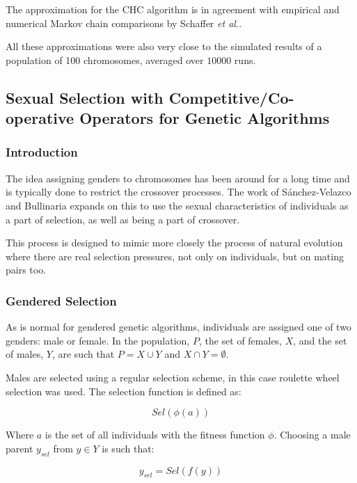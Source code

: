 \documentclass[10pt, a4paper]{article}
\begin{document}
The approximation for the CHC algorithm is in agreement with empirical and 
numerical Markov chain comparisons by Schaffer 
\textit{et al.}\cite{Schaffer1998Effect}.

All these approximations were also very close to the simulated results
of a population of 100 chromosomes, averaged over $10000$ runs.

\subsection{Sexual Selection with Competitive/Co-operative Operators for Genetic Algorithms}

\subsubsection{Introduction}
The idea assigning genders to chromosomes has been around for a long time
and is typically done to restrict the crossover processes. The work of
S\'anchez-Velazco and Bullinaria\cite{SanchezVelazco2003Sexual} expands on this
to use the sexual characteristics of individuals as a part of selection, as 
well as being a part of crossover.

This process is designed to mimic more closely the process of natural evolution
where there are real selection pressures, not only on individuals, but on
mating pairs too.

\subsubsection{Gendered Selection}
As is normal for gendered genetic algorithms, individuals are assigned one of
two genders: male or female. In the population, $P$, the set of females, $X$,
and the set of males, $Y$, are such that $P = X \cup Y$ and $X \cap Y = \emptyset$.

Males are selected using a regular selection scheme, in this case roulette 
wheel selection was used. The selection function is defined as:

\begin{equation}
Sel(\phi(a))
\end{equation}

Where $a$ is the set of all individuals with the fitness function $\phi$.
Choosing a male parent $y_{sel}$ from $y \in Y$ is such that:

\begin{equation}
y_{sel} = Sel(f(y))
\end{equation}
\end{document}
